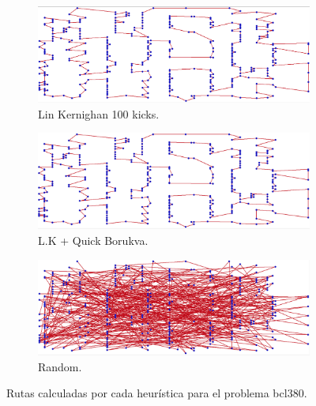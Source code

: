 \documentclass[13pt,a4paper]{article}
\begin{document}
\begin{figure}[b]
    \begin{subfigure}[t]{0.3\textwidth}
        \centering
        \includegraphics[width=\textwidth]{img/1/L100.png}
        \caption{Lin Kernighan 100 kicks.}
    \end{subfigure}
    \begin{subfigure}[t]{0.3\textwidth}
        \centering
        \includegraphics[width=\textwidth]{img/1/L+Q.png}
        \caption{L.K + Quick Borukva.}
    \end{subfigure}
    \begin{subfigure}[t]{0.3\textwidth}
        \centering
        \includegraphics[width=\textwidth]{img/1/R.png}
        \caption{Random.}
    \end{subfigure}
    \caption{Rutas calculadas por cada heurística para el problema bcl380.}
\end{figure}
  
\end{document}
